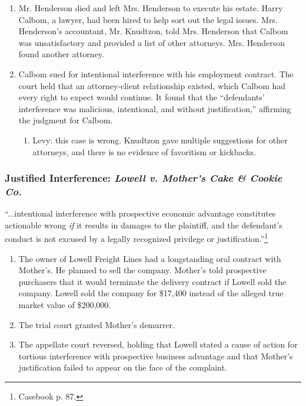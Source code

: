 \begin{enumerate}
    \item Mr. Henderson died and left Mrs. Henderson to execute his estate. 
    Harry Calbom, a lawyer, had been hired to help sort out the legal issues. 
    Mrs. Henderson's accountant, Mr. Knudtzon, told Mrs. Henderson that Calbom 
    was unsatisfactory and provided a list of other attorneys. Mrs. Henderson 
    found another attorney.
    \item Calbom sued for intentional interference with his employment 
    contract. The court held that an attorney-client relationship existed, 
    which Calbom had every right to expect would continue. It found that the 
    ``defendants' interference was malicious, intentional, and without 
    justification,'' affirming the judgment for Calbom.
    \begin{enumerate}
        \item Levy: this case is wrong. Knudtzon gave multiple suggestions for 
        other attorneys, and there is no evidence of favoritism or kickbacks.
    \end{enumerate}
\end{enumerate}

\subsubsection{Justified Interference: \emph{Lowell v. Mother's Cake \& Cookie Co.}}

``...intentional interference with prospective economic advantage constitutes 
actionable wrong \emph{if} it results in damages to the plaintiff, and the 
defendant's conduct is not excused by a legally recognized privilege or 
justification.''\footnote{Casebook p. 87.}

\begin{enumerate}
    \item The owner of Lowell Freight Lines had a longstanding oral contract with 
    Mother's. He planned to sell the company. Mother's told prospective 
    purchasers that it would terminate the delivery contract if Lowell sold 
    the company. Lowell sold the company for \$17,400 instead of the alleged 
    true market value of \$200,000.
    \item The trial court granted Mother's demurrer.
    \item The appellate court reversed, holding that Lowell stated a cause of 
    action for tortious interference with prospective business advantage and 
    that Mother's justification failed to appear on the face of the 
    complaint.
\end{enumerate}

